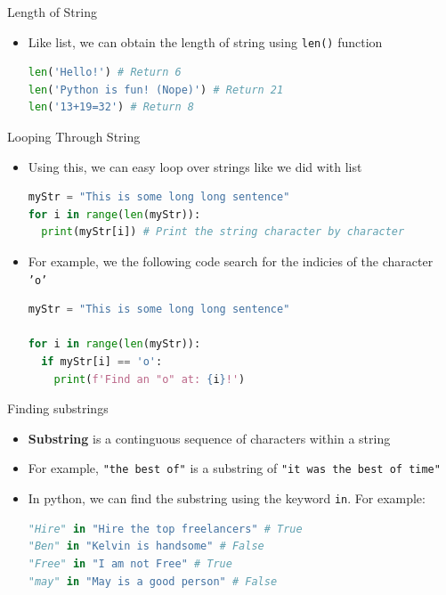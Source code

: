 \documentclass[10pt,xcolor={table,dvipsnames},t]{beamer}
\begin{document}
\begin{frame}[fragile]{Length of String}
  \begin{itemize}
    \item Like list, we can obtain the length of string using \texttt{len()} function
\begin{lstlisting}[language=python]
len('Hello!') # Return 6
len('Python is fun! (Nope)') # Return 21
len('13+19=32') # Return 8
\end{lstlisting}
  \end{itemize}
\end{frame}

\begin{frame}[fragile]{Looping Through String}
  \begin{itemize}
    \item Using this, we can easy loop over strings like we did with list
\begin{lstlisting}[language=python]
myStr = "This is some long long sentence"
for i in range(len(myStr)):
  print(myStr[i]) # Print the string character by character
\end{lstlisting}
    \item For example, we the following code search for the indicies of the character \texttt{'o'}
\begin{lstlisting}[language=python]
myStr = "This is some long long sentence"

for i in range(len(myStr)):
  if myStr[i] == 'o':
    print(f'Find an "o" at: {i}!')
\end{lstlisting}
  \end{itemize}
\end{frame}

\begin{frame}[fragile]{Finding substrings}
  \begin{itemize}
    \item \textbf{Substring} is a continguous sequence of characters within a string 
    \item For example, \texttt{"the best of"} is a substring of \texttt{"it was the best of time"}
    \item In python, we can find the substring using the keyword \texttt{in}. For example:
\begin{lstlisting}[language=python]
"Hire" in "Hire the top freelancers" # True 
"Ben" in "Kelvin is handsome" # False
"Free" in "I am not Free" # True
"may" in "May is a good person" # False
\end{lstlisting}
  \end{itemize}
\end{frame}
\end{document}
